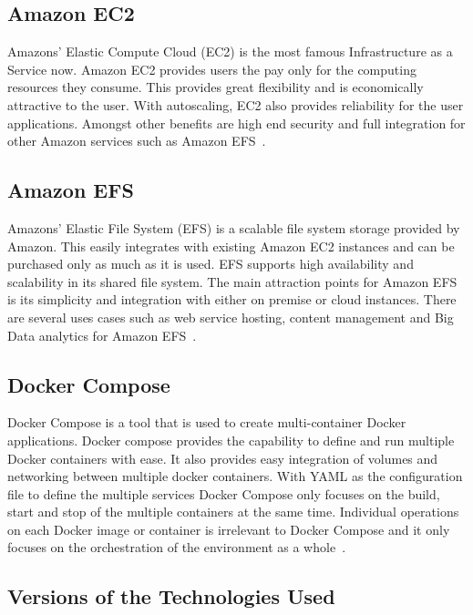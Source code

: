 \subsection{Amazon EC2}

Amazons' Elastic Compute Cloud (EC2) is the most famous Infrastructure as a 
Service now. Amazon EC2 provides users the pay only for the computing 
resources they consume. This provides great flexibility and is economically 
attractive to the user. With autoscaling, EC2 also provides reliability for 
the user applications. Amongst other benefits are high end security and full 
integration for other Amazon services such as Amazon 
EFS~\cite{hid-sp18-416-www-amazon-ec2}. 

\subsection{Amazon EFS}

Amazons' Elastic File System (EFS) is a scalable file system storage provided 
by Amazon. This easily integrates with existing Amazon EC2 instances and can 
be purchased only as much as it is used. EFS supports high availability and 
scalability in its shared file system. The main attraction points for Amazon 
EFS is its simplicity and integration with either on premise or cloud 
instances. There are several uses cases such as web service hosting, content 
management and Big Data analytics for Amazon 
EFS~\cite{hid-sp18-416-www-amazon-efs}. 

\subsection{Docker Compose}

Docker Compose is a tool that is used to create multi-container Docker 
applications. Docker compose provides the capability to define and run 
multiple Docker containers with ease. It also provides easy integration of 
volumes and networking between multiple docker containers. With YAML as the 
configuration file to define the multiple services Docker Compose only focuses 
on the build, start and stop of the multiple containers at the same time. 
Individual operations on each Docker image or container is irrelevant to 
Docker Compose and it only focuses on the orchestration of the environment as 
a whole~\cite{hid-sp18-416-www-docker-compose-blog}. 
	
\subsection{Versions of the Technologies Used}

